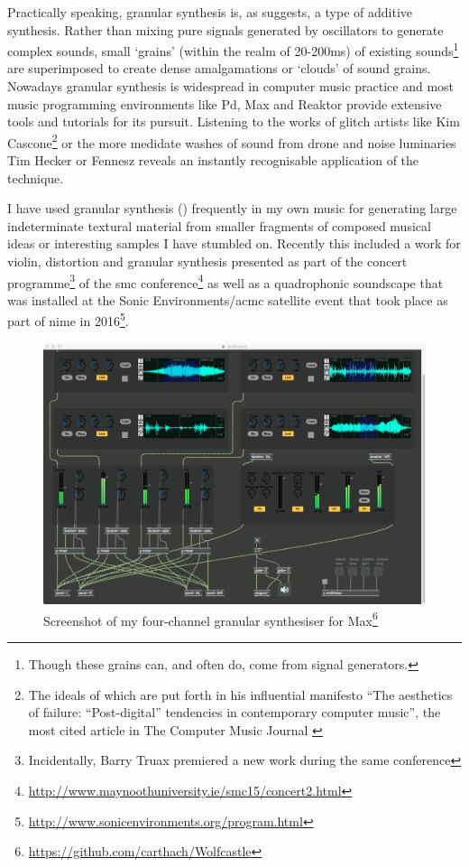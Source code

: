Practically speaking, granular synthesis is, as \cite{Roads1998} suggests, a type of additive synthesis. Rather than mixing pure signals generated by oscillators to generate complex sounds, small `grains' (within the realm of 20-200ms) of existing sounds\footnote{Though these grains can, and often do, come from signal generators.} are superimposed to create dense amalgamations or `clouds' \citep{Collins2011a, Thomson2004} of sound grains. Nowadays granular synthesis is widespread in computer music practice and most music programming environments like Pd, Max and Reaktor provide extensive tools and tutorials for its pursuit. Listening to the works of glitch artists like Kim Cascone\footnote{The ideals of which are put forth in his influential manifesto ``The aesthetics of failure: ``Post-digital'' tendencies in contemporary computer music'', the most cited article in The Computer Music Journal \citep{Cascone2000}}\citep{Latartara2010} or the more medidate washes of sound from drone and noise luminaries Tim Hecker or Fennesz reveals an instantly recognisable application of the technique. 

I have used granular synthesis () frequently in my own music for generating large indeterminate textural material from smaller fragments of composed musical ideas or interesting samples I have stumbled on. Recently this included a work  for violin, distortion and granular synthesis presented as part of the concert programme\footnote{Incidentally, Barry Truax premiered a new work during the same conference} of the \acrfull{smc} conference\footnote{\url{http://www.maynoothuniversity.ie/smc15/concert2.html}} as well as a quadrophonic soundscape that was installed at the Sonic Environments/\acrfull{acmc} satellite event that took place as part of \acrfull{nime} in 2016\footnote{\url{http://www.sonicenvironments.org/program.html}}. 

\begin{figure}
	\begin{center}
		\includegraphics[width=1.0\textwidth]{ch04_sota/figures/wolfecastle.png}
	\end{center}
	\caption[Screenshot of my four-channel granular synthesiser for Max]{Screenshot of my four-channel granular synthesiser for Max\footnote{\url{https://github.com/carthach/Wolfcastle}}}
	\label{fig:wolfcastle}
\end{figure}


